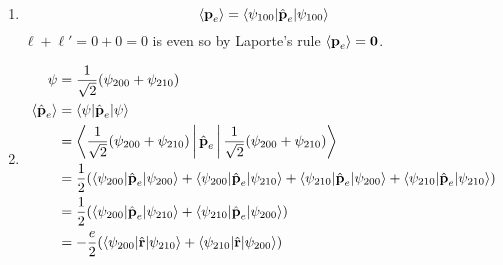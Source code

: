 \documentclass{article}
\renewcommand{\vec}[1]{\boldsymbol{\mathbf{#1}}}
\newcommand{\uvec}[1]{\hat{\vec{#1}}}
\begin{document}
\begin{enumerate}
  \item \[\braket{\vec{p}_e} = \braket{\psi_{1 0 0} | \uvec{p}_e | \psi_{1 0 0}}\] $\ell + \ell' = 0 + 0 = 0$ is even so by Laporte's rule $\braket{\vec{p}_e} = \vec{0}$.

  \item

        \begin{align*}
          \psi                & = \frac{1}{\sqrt{2}} (\psi_{2 0 0} + \psi_{2 1 0})                                                                                                                                                                            \\
          \braket{\uvec{p}_e} & = \braket{\psi | \uvec{p}_e | \psi}                                                                                                                                                                                           \\
                              & = \Braket{\frac{1}{\sqrt{2}} (\psi_{2 0 0} + \psi_{2 1 0}) | \uvec{p}_e | \frac{1}{\sqrt{2}} (\psi_{2 0 0} + \psi_{2 1 0})}                                                                                                   \\
                              & = \frac{1}{2} (\braket{\psi_{2 0 0} | \uvec{p}_e | \psi_{2 0 0}} + \braket{\psi_{2 0 0} | \uvec{p}_e | \psi_{2 1 0}} + \braket{\psi_{2 1 0} | \uvec{p}_e | \psi_{2 0 0}} + \braket{\psi_{2 1 0} | \uvec{p}_e | \psi_{2 1 0}}) \\
                              & = \frac{1}{2} (\braket{\psi_{2 0 0} | \uvec{p}_e | \psi_{2 1 0}} + \braket{\psi_{2 1 0} | \uvec{p}_e | \psi_{2 0 0}})                                                                                                         \\
                              & = -\frac{e}{2} (\braket{\psi_{2 0 0} | \uvec{r} | \psi_{2 1 0}} + \braket{\psi_{2 1 0} | \uvec{r} | \psi_{2 0 0}})                                                                                                            \\
        \end{align*}
\end{enumerate}

\setcounter{subsection}{14}
\subsection{}
\end{document}
